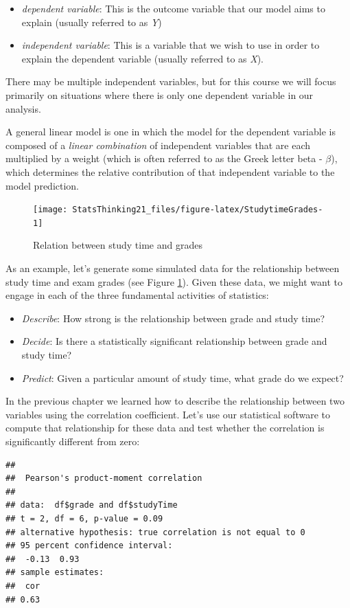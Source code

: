 \documentclass[
  12pt,
]{book}
\providecommand{\tightlist}{%
  \setlength{\itemsep}{0pt}\setlength{\parskip}{0pt}}
\begin{document}
\begin{itemize}
\tightlist
\item
  \emph{dependent variable}: This is the outcome variable that our model aims to explain (usually referred to as \emph{Y})
\item
  \emph{independent variable}: This is a variable that we wish to use in order to explain the dependent variable (usually referred to as \emph{X}).
\end{itemize}

There may be multiple independent variables, but for this course we will focus primarily on situations where there is only one dependent variable in our analysis.

A general linear model is one in which the model for the dependent variable is composed of a \emph{linear combination} of independent variables that are each multiplied by a weight (which is often referred to as the Greek letter beta - \(\beta\)), which determines the relative contribution of that independent variable to the model prediction.

\begin{figure}
\texttt{[image: StatsThinking21\_files/figure-latex/StudytimeGrades-1]} \caption{Relation between study time and grades}\label{fig:StudytimeGrades}
\end{figure}

As an example, let's generate some simulated data for the relationship between study time and exam grades (see Figure \ref{fig:StudytimeGrades}). Given these data, we might want to engage in each of the three fundamental activities of statistics:

\begin{itemize}
\tightlist
\item
  \emph{Describe}: How strong is the relationship between grade and study time?
\item
  \emph{Decide}: Is there a statistically significant relationship between grade and study time?
\item
  \emph{Predict}: Given a particular amount of study time, what grade do we expect?
\end{itemize}

In the previous chapter we learned how to describe the relationship between two variables using the correlation coefficient. Let's use our statistical software to compute that relationship for these data and test whether the correlation is significantly different from zero:

\begin{verbatim}
## 
##  Pearson's product-moment correlation
## 
## data:  df$grade and df$studyTime
## t = 2, df = 6, p-value = 0.09
## alternative hypothesis: true correlation is not equal to 0
## 95 percent confidence interval:
##  -0.13  0.93
## sample estimates:
##  cor 
## 0.63
\end{verbatim}
\end{document}

